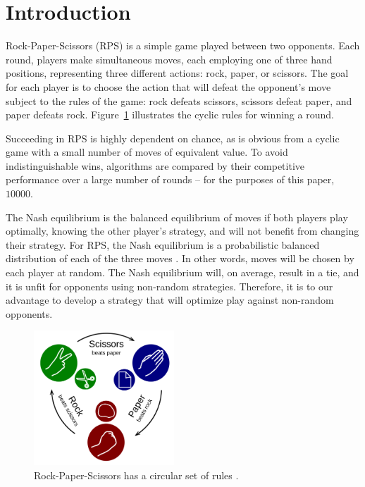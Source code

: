
\section{Introduction}
\label{sec:intro}

Rock-Paper-Scissors (RPS) is a simple game played between two opponents.  Each round, players make simultaneous moves, each employing one of three hand positions, representing three different actions: rock, paper, or scissors.  The goal for each player is to choose the action that will defeat the opponent's move subject to the rules of the game: rock defeats scissors, scissors defeat paper, and paper defeats rock.  Figure~\ref{fig:rps} illustrates the cyclic rules for winning a round.

Succeeding in RPS is highly dependent on chance, as is obvious from a cyclic game with a small number of moves of equivalent value.  To avoid indistinguishable wins, algorithms are compared by their competitive performance over a large number of rounds -- for the purposes of this paper, $10000$.

The Nash equilibrium is the balanced equilibrium of moves if both players play optimally, knowing the other player's strategy, and will not benefit from changing their strategy. For RPS, the Nash equilibrium is a probabilistic balanced distribution of each of the three moves \cite{noregrets}.  In other words, moves will be chosen by each player at random.  The Nash equilibrium will, on average, result in a tie, and it is unfit for opponents using non-random strategies.  Therefore, it is to our advantage to develop a strategy that will optimize play against non-random opponents.

\begin{figure}[ht]
	\centering
	\includegraphics[width=0.47\textwidth]{figs/rps.png}
	\caption{Rock-Paper-Scissors has a circular set of rules \cite{fig:rps}.}
	\label{fig:rps}
\end{figure}

